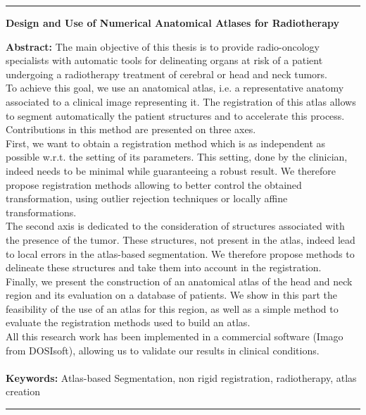 \documentclass[a4paper,11pt,twoside]{StyleThese}
\begin{document}
\begin{vcenterpage}
\noindent\rule[2pt]{\textwidth}{0.5pt}
\begin{center}
{\large\textbf{Design and Use of Numerical Anatomical Atlases for Radiotherapy\\}}
\end{center}
{\large\textbf{Abstract:}}
The main objective of this thesis is to provide radio-oncology specialists with automatic tools for delineating organs at risk of a patient undergoing a radiotherapy treatment of cerebral or head and neck tumors.
\\
To achieve this goal, we use an anatomical atlas, i.e. a representative anatomy associated to a clinical image representing it. The registration of this atlas allows to segment automatically the patient structures and to accelerate this process. Contributions in this method are presented on three axes.
\\
First, we want to obtain a registration method which is as independent as possible w.r.t. the setting of its parameters. This setting, done by the clinician, indeed needs to be minimal while guaranteeing a robust result. We therefore propose registration methods allowing to better control the obtained transformation, using outlier rejection techniques or locally affine transformations.
\\
The second axis is dedicated to the consideration of structures associated with the presence of the tumor. These structures, not present in the atlas, indeed lead to local errors in the atlas-based segmentation. We therefore propose methods to delineate these structures and take them into account in the registration.
\\
Finally, we present the construction of an anatomical atlas of the head and neck region and its evaluation on a database of patients. We show in this part the feasibility of the use of an atlas for this region, as well as a simple method to evaluate the registration methods used to build an atlas.
\\
All this research work has been implemented in a commercial software (Imago from DOSIsoft), allowing us to validate our results in clinical conditions.
\\
\\
{\large\textbf{Keywords:}}
Atlas-based Segmentation, non rigid registration, radiotherapy, atlas creation
\\
\noindent\rule[2pt]{\textwidth}{0.5pt}
\end{vcenterpage}
\end{document}
